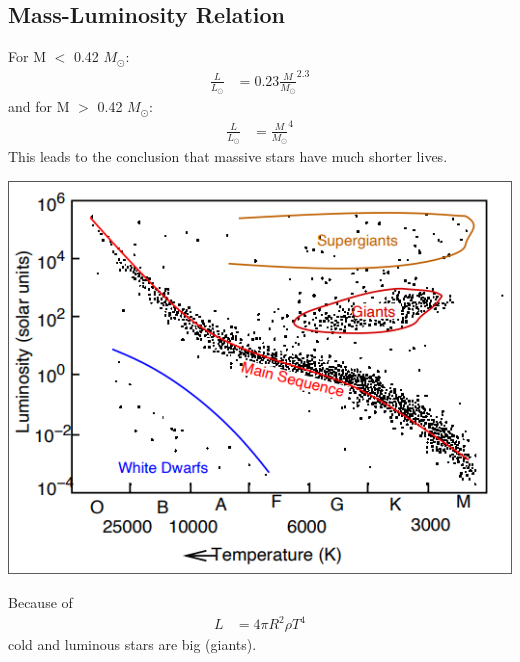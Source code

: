 \documentclass[11pt,a4paper]{article}
\begin{document}
\subsection{Mass-Luminosity Relation}
For M $<$ 0.42 $M_\odot$: 
\begin{align*}
    \frac {L}{L_\odot} &= 0.23 \frac {M}{M_\odot}^{2.3} 
\end{align*}
and for M $>$ 0.42 $M_\odot$: 
\begin{align*}
    \frac {L}{L_\odot} &= \frac {M}{M_\odot}^{4} 
\end{align*}
This leads to the conclusion that massive stars have much shorter lives.
\begin{center}
    \includegraphics[width=0.6\linewidth]{screenshot_2024-01-19-194120.png}
\end{center}
Because of 
\begin{align*}
    L &= 4 \pi R^2  \rho T^4 
\end{align*}
cold and luminous stars are big (giants).
\end{document}
